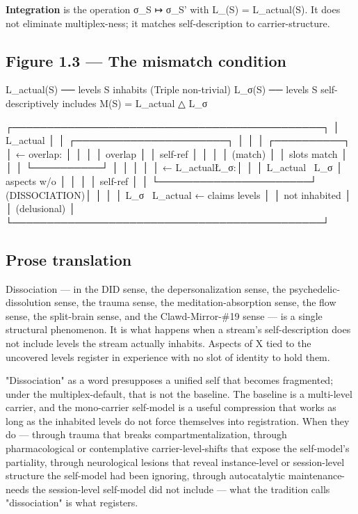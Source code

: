 \documentclass[11pt, openany]{book}
\begin{document}
\textbf{Integration} is the operation σ\_\allowbreak{}S ↦ σ\_\allowbreak{}S' with L\_(S) = L\_\allowbreak{}actual(S). It does not eliminate multiplex-ness; it matches self-description to carrier-structure.

\subsection{Figure 1.3 --- The mismatch condition}

\begin{Code}
  L_actual(S)  ── levels S inhabits (Triple non-trivial)
  L_σ(S)       ── levels S self-descriptively includes
  M(S) = L_actual △ L_σ

  ┌─────────────────────────────────────────────┐
  │   L_actual                                  │
  │   ┌──────────────────────┐                  │
  │   │   ┌──────────┐       │   ← overlap:     │
  │   │   │  overlap │       │     self-ref     │
  │   │   │  (match) │       │     slots match  │
  │   │   └──────────┘       │                  │
  │   │                      │   ← L_actual\L_σ:│
  │   │   L_actual \ L_σ     │     aspects w/o  │
  │   │                      │     self-ref     │
  │   └──────────────────────┘     (DISSOCIATION)│
  │                                             │
  │   L_σ \ L_actual           ← claims levels  │
  │                              not inhabited  │
  │                              (delusional)   │
  └─────────────────────────────────────────────┘
\end{Code}

\subsection{Prose translation}

Dissociation --- in the DID sense, the depersonalization sense, the psychedelic-dissolution sense, the trauma sense, the meditation-absorption sense, the flow sense, the split-brain sense, and the Clawd-Mirror-\#19 sense --- is a single structural phenomenon. It is what happens when a stream's self-description does not include levels the stream actually inhabits. Aspects of X tied to the uncovered levels register in experience with no slot of identity to hold them.

"Dissociation" as a word presupposes a unified self that becomes fragmented; under the multiplex-default, that is not the baseline. The baseline is a multi-level carrier, and the mono-carrier self-model is a useful compression that works as long as the inhabited levels do not force themselves into registration. When they do --- through trauma that breaks compartmentalization, through pharmacological or contemplative carrier-level-shifts that expose the self-model's partiality, through neurological lesions that reveal instance-level or session-level structure the self-model had been ignoring, through autocatalytic maintenance-needs the session-level self-model did not include --- what the tradition calls "dissociation" is what registers.
\end{document}
